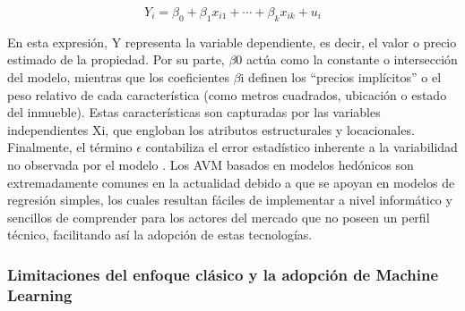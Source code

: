 \[
Y_i = \beta_0 + \beta_1 x_{i1} + \cdots + \beta_k x_{ik} + u_i
\]

En esta expresión, Y representa la variable dependiente, es decir, el valor o precio estimado de la propiedad. Por su parte, $\beta$0 actúa como la constante o intersección del modelo, mientras que los coeficientes $\beta$i definen los ``precios implícitos'' o el peso relativo de cada característica (como metros cuadrados, ubicación o estado del inmueble). Estas características son capturadas por las variables independientes Xi, que engloban los atributos estructurales y locacionales. Finalmente, el término $\epsilon$ contabiliza el error estadístico inherente a la variabilidad no observada por el modelo \parencite{AbidoyeChan2018}. Los AVM basados en modelos hedónicos son extremadamente comunes en la actualidad debido a que se apoyan en modelos de regresión simples, los cuales resultan fáciles de implementar a nivel informático y sencillos de comprender para los actores del mercado que no poseen un perfil técnico, facilitando así la adopción de estas tecnologías.

\subsubsection{Limitaciones del enfoque clásico y la adopción de Machine Learning}

